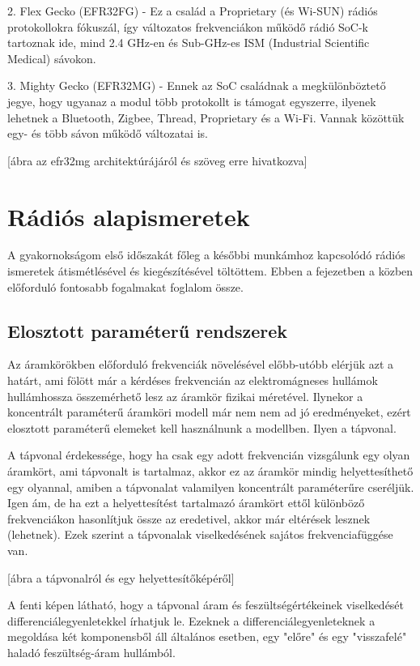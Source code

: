 \documentclass[a4paper,12pt,titlepage]{article}
\begin{document}
	2. Flex Gecko (EFR32FG) - Ez a család a Proprietary (és Wi-SUN) rádiós protokollokra fókuszál, így változatos frekvenciákon működő rádió SoC-k tartoznak ide, mind 2.4 GHz-en és Sub-GHz-es ISM (Industrial Scientific Medical) sávokon.

	3. Mighty Gecko (EFR32MG) - Ennek az SoC családnak a megkülönböztető jegye, hogy ugyanaz a modul több protokollt is támogat egyszerre, ilyenek lehetnek a Bluetooth, Zigbee, Thread, Proprietary és a Wi-Fi. Vannak közöttük egy- és több sávon működő változatai is.

[ábra az efr32mg architektúrájáról és szöveg erre hivatkozva]


\section{Rádiós alapismeretek}

A gyakornokságom első időszakát főleg a későbbi munkámhoz kapcsolódó rádiós ismeretek átismétlésével és kiegészítésével töltöttem. Ebben a fejezetben a közben előforduló fontosabb fogalmakat foglalom össze.

\subsection{Elosztott paraméterű rendszerek}

Az áramkörökben előforduló frekvenciák növelésével előbb-utóbb elérjük azt a határt, ami fölött már a kérdéses frekvencián az elektromágneses hullámok hullámhossza összemérhető lesz az áramkör fizikai méretével. Ilynekor a koncentrált paraméterű áramköri modell már nem nem ad jó eredményeket, ezért elosztott paraméterű elemeket kell használnunk a modellben. Ilyen a tápvonal.

A tápvonal érdekessége, hogy ha csak egy adott frekvencián vizsgálunk egy olyan áramkört, ami tápvonalt is tartalmaz, akkor ez az áramkör mindig helyettesíthető egy olyannal, amiben a tápvonalat valamilyen koncentrált paraméterűre cseréljük. Igen ám, de ha ezt a helyettesítést tartalmazó áramkört ettől különböző frekvenciákon hasonlítjuk össze az eredetivel, akkor már eltérések lesznek (lehetnek). Ezek szerint a tápvonalak viselkedésének sajátos frekvenciafüggése van.

[ábra a tápvonalról és egy helyettesítőképéről]

A fenti képen látható, hogy a tápvonal áram és feszültségértékeinek viselkedését differenciálegyenletekkel írhatjuk le. Ezeknek a differenciálegyenleteknek a megoldása két komponensből áll általános esetben, egy "előre" és egy "visszafelé" haladó feszültség-áram hullámból.
\end{document}
